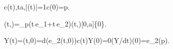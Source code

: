 c(t),\leq t\leq a,|(t)|=1c(0)=p.

\phi(t,\theta)=\exp_p(t\cos\theta\,e_1+t\sin\theta\,e_2)(t,\theta)[0,a]\times\{0\}.

Y(t)=\frac{\partial\phi}{\partial\theta}(t,0)=d\phi(e_2(t,0))c(t)Y(0)=0(\nabla Y/dt)(0)=e_2(p).
